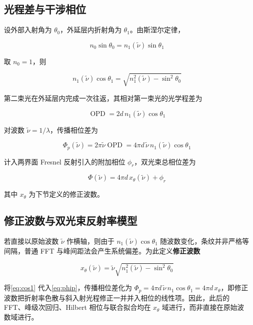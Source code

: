 \documentclass[withoutpreface,bwprint]{cumcmthesis}
\begin{document}
\subsection{光程差与干涉相位}
设外部入射角为 $\theta_0$，外延层内折射角为 $\theta_1$。由斯涅尔定律，

\begin{equation}
	n_0\sin\theta_0=n_1(\tilde\nu)\sin\theta_1
	\label{eq:snell}
\end{equation}

取 $n_0=1$，则

\begin{equation}
	n_1(\tilde\nu)\cos\theta_1=\sqrt{n_1^2(\tilde\nu)-\sin^2\theta_0}
	\label{eq:cos1}
\end{equation}

第二束光在外延层内完成一次往返，其相对第一束光的光学程差为

\begin{equation}
	\operatorname{OPD}=2d\,n_1(\tilde\nu)\cos\theta_1
	\label{eq:opd}
\end{equation}

对波数 $\tilde\nu=1/\lambda$，传播相位差为

\begin{equation}
	\Phi_p(\tilde\nu)=2\pi\tilde\nu\operatorname{OPD}=4\pi d\,\tilde\nu\,n_1(\tilde\nu)\cos\theta_1
	\label{eq:phip}
\end{equation}

计入两界面 Fresnel 反射引入的附加相位 $\phi_r$，双光束总相位差为

\begin{equation}
	\Phi(\tilde\nu)=4\pi d\,x_\theta(\tilde\nu)+\phi_r
	\label{eq:Phi}
\end{equation}

其中 $x_\theta$ 为下节定义的修正波数。

\subsection{修正波数与双光束反射率模型}
若直接以原始波数 $\tilde\nu$ 作横轴，则由于 $n_1(\tilde\nu)\cos\theta_1$ 随波数变化，条纹并非严格等间隔，普通 FFT 与峰间距法会产生系统偏差。为此定义\textbf{修正波数}

\begin{equation}
	x_\theta(\tilde\nu)=\tilde\nu\sqrt{n_1^2(\tilde\nu)-\sin^2\theta_0}
	\label{eq:xtheta}
\end{equation}

将\cref{eq:cos1} 代入\cref{eq:phip}，传播相位差化为 $\Phi_p=4\pi d\,\tilde\nu\,n_1\cos\theta_1=4\pi d\,x_\theta$，即修正波数把折射率色散与斜入射光程修正一并并入相位的线性项。因此，此后的 FFT、峰级次回归、Hilbert 相位与联合拟合均在 $x_\theta$ 域进行，而非直接在原始波数域进行。
\end{document}
